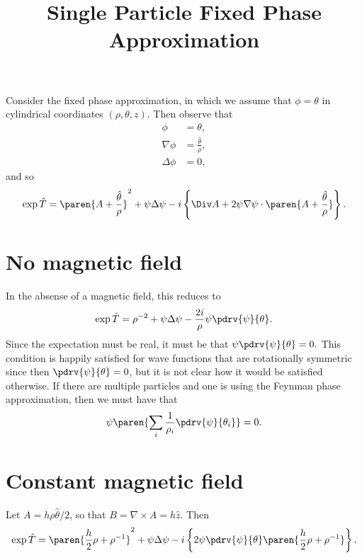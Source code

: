\documentclass[twocolumn,showpacs,preprintnumbers,amsmath,amssymb,nofootinbib,pra,floatfix]{revtex4}
\title{Single Particle Fixed Phase Approximation}
\begin{document}
Consider the fixed phase approximation, in which we assume that $\phi = \theta$ in cylindrical coordinates $(\rho,\theta,z)$.  Then observe that
$$\begin{aligned}
\phi &= \theta,\\
\nabla \phi &= \frac{\hat\theta}{\rho},\\
\Delta \phi &= 0,
\end{aligned}
$$ and so $$\exp{\hat T} = \paren{A+\frac{\hat\theta}{\rho}}^2 + \psi\Delta\psi - i\left\{\Div A + 2\psi\nabla\psi \cdot \paren{A+\frac{\hat\theta}{\rho}}\right\}.$$  


\section{No magnetic field}
In the absense of a magnetic field, this reduces to  $$\exp{\hat T} =\rho^{-2} + \psi\Delta\psi - \frac{2i}{\rho}\psi\pdrv{\psi}{\theta}.$$ Since the expectation must be real, it must be that $\psi \pdrv{\psi}{\theta}=0.$  This condition is happily satisfied for wave functions that are rotationally symmetric since then $\pdrv{\psi}{\theta}=0$, but it is not clear how it would be satisfied otherwise.  If there are multiple particles and one is using the Feynman phase approximation, then we must have that $$\psi \paren{\sum_i \frac{1}{\rho_i}\pdrv{\psi}{\theta_i}} = 0.$$

\section{Constant magnetic field}

Let $A=h\rho \hat\theta/2$, so that $B=\nabla\times A = h\hat z$.  Then
$$\exp{\hat T} =  \paren{\frac{h}{2}\rho+\rho^{-1}}^2 + \psi\Delta\psi - i\left\{2\psi\pdrv{\psi}{\theta} \paren{\frac{h}{2}\rho + \rho^{-1}}\right\}.$$
\end{document}
